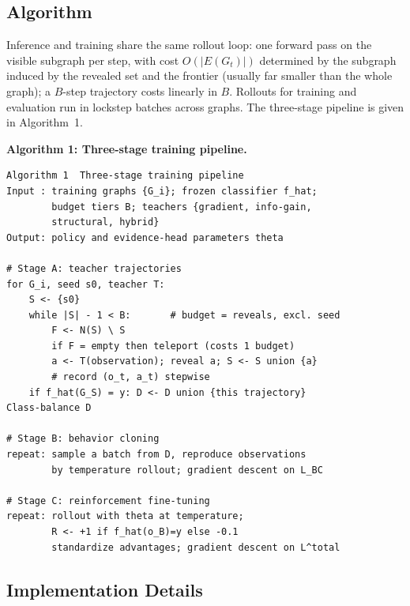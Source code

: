 \documentclass{article}
\begin{document}
\subsection{Algorithm}
\label{subsec:algo}

Inference and training share the same rollout loop: one forward pass on the visible subgraph per step, with cost $O(|E(G_t)|)$ determined by the subgraph induced by the revealed set and the frontier (usually far smaller than the whole graph); a $B$-step trajectory costs linearly in $B$. Rollouts for training and evaluation run in lockstep batches across graphs. The three-stage pipeline is given in Algorithm~1.

\begin{center}
\begin{minipage}{0.96\linewidth}
\small
\textbf{Algorithm 1: Three-stage training pipeline.}

\smallskip
\begin{verbatim}
Algorithm 1  Three-stage training pipeline
Input : training graphs {G_i}; frozen classifier f_hat;
        budget tiers B; teachers {gradient, info-gain,
        structural, hybrid}
Output: policy and evidence-head parameters theta

# Stage A: teacher trajectories
for G_i, seed s0, teacher T:
    S <- {s0}
    while |S| - 1 < B:       # budget = reveals, excl. seed
        F <- N(S) \ S
        if F = empty then teleport (costs 1 budget)
        a <- T(observation); reveal a; S <- S union {a}
        # record (o_t, a_t) stepwise
    if f_hat(G_S) = y: D <- D union {this trajectory}
Class-balance D

# Stage B: behavior cloning
repeat: sample a batch from D, reproduce observations
        by temperature rollout; gradient descent on L_BC

# Stage C: reinforcement fine-tuning
repeat: rollout with theta at temperature;
        R <- +1 if f_hat(o_B)=y else -0.1
        standardize advantages; gradient descent on L^total
\end{verbatim}
\end{minipage}
\end{center}

\subsection{Implementation Details}
\label{subsec:impl}
\end{document}
